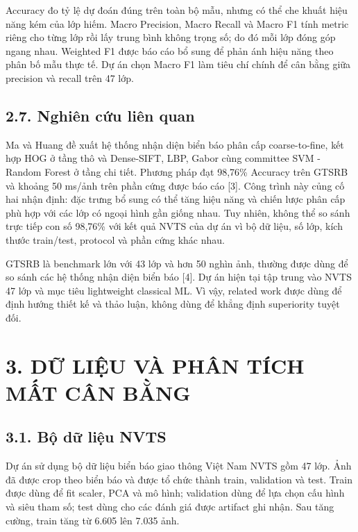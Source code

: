 \documentclass[12pt,a4paper]{article}
\begin{document}
Accuracy đo tỷ lệ dự đoán đúng trên toàn bộ mẫu, nhưng có thể che khuất
hiệu năng kém của lớp hiếm. Macro Precision, Macro Recall và Macro F1
tính metric riêng cho từng lớp rồi lấy trung bình không trọng số; do đó
mỗi lớp đóng góp ngang nhau. Weighted F1 được báo cáo bổ sung để phản
ánh hiệu năng theo phân bố mẫu thực tế. Dự án chọn Macro F1 làm tiêu chí
chính để cân bằng giữa precision và recall trên 47 lớp.

\subsection{2.7. Nghiên cứu liên
quan}\label{nghiuxean-cux1ee9u-liuxean-quan}

Ma và Huang đề xuất hệ thống nhận diện biển báo phân cấp coarse-to-fine,
kết hợp HOG ở tầng thô và Dense-SIFT, LBP, Gabor cùng committee SVM -
Random Forest ở tầng chi tiết. Phương pháp đạt 98,76\% Accuracy trên
GTSRB và khoảng 50 ms/ảnh trên phần cứng được báo cáo {[}3{]}. Công
trình này củng cố hai nhận định: đặc trưng bổ sung có thể tăng hiệu năng
và chiến lược phân cấp phù hợp với các lớp có ngoại hình gần giống nhau.
Tuy nhiên, không thể so sánh trực tiếp con số 98,76\% với kết quả NVTS
của dự án vì bộ dữ liệu, số lớp, kích thước train/test, protocol và phần
cứng khác nhau.

GTSRB là benchmark lớn với 43 lớp và hơn 50 nghìn ảnh, thường được dùng
để so sánh các hệ thống nhận diện biển báo {[}4{]}. Dự án hiện tại tập
trung vào NVTS 47 lớp và mục tiêu lightweight classical ML. Vì vậy,
related work được dùng để định hướng thiết kế và thảo luận, không dùng
để khẳng định superiority tuyệt đối.

\section{3. DỮ LIỆU VÀ PHÂN TÍCH MẤT CÂN
BẰNG}\label{dux1eef-liux1ec7u-vuxe0-phuxe2n-tuxedch-mux1ea5t-cuxe2n-bux1eb1ng}

\subsection{3.1. Bộ dữ liệu NVTS}\label{bux1ed9-dux1eef-liux1ec7u-nvts}

Dự án sử dụng bộ dữ liệu biển báo giao thông Việt Nam NVTS gồm 47 lớp.
Ảnh đã được crop theo biển báo và được tổ chức thành train, validation
và test. Train được dùng để fit scaler, PCA và mô hình; validation dùng
để lựa chọn cấu hình và siêu tham số; test dùng cho các đánh giá được
artifact ghi nhận. Sau tăng cường, train tăng từ 6.605 lên 7.035 ảnh.
\end{document}
